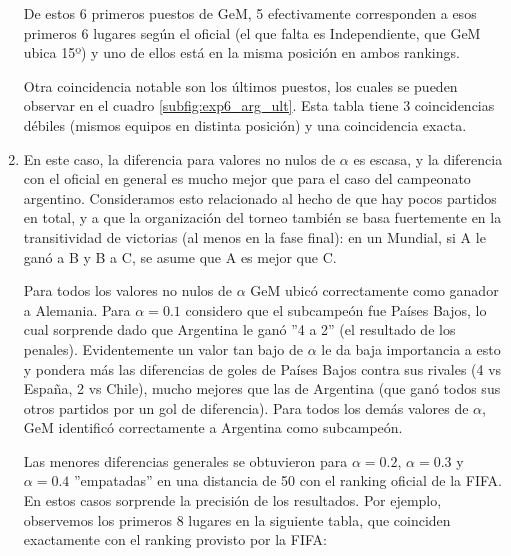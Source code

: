 \begin{enumerate}[parsep=1ex]
        \par De estos 6 primeros puestos de GeM, 5 efectivamente corresponden a
        esos primeros 6 lugares según el oficial (el que falta es Independiente,
        que GeM ubica 15º) y uno de ellos está en la misma posición en ambos
        rankings.

        \par Otra coincidencia notable son los últimos puestos, los cuales se
        pueden observar en el cuadro \ref{subfig:exp6_arg_ult}. Esta tabla tiene
        3 coincidencias débiles (mismos equipos en distinta posición) y una
        coincidencia exacta.\\

    \item En este caso, la diferencia para valores no nulos de $\alpha$ 
        es escasa, y la diferencia con el oficial en general es mucho mejor que
        para el caso del campeonato argentino. Consideramos esto relacionado al
        hecho de que hay pocos partidos en total, y a que la organización del
        torneo también se basa fuertemente en la transitividad de victorias (al
        menos en la fase final): en un Mundial, si A le ganó a B y B a C, se asume que A es
        mejor que C.

        \par Para todos los valores no nulos de $\alpha$ GeM ubicó
        correctamente como ganador a Alemania. Para $\alpha=0.1$ considero que
        el subcampeón fue Países Bajos, lo cual sorprende dado que Argentina le
        ganó ''4 a 2'' (el resultado de los penales). Evidentemente un valor tan
        bajo de $\alpha$ le da baja importancia a esto y pondera más las
        diferencias de goles de Países Bajos contra sus rivales (4 vs España, 2
        vs Chile), mucho mejores que las de Argentina (que ganó todos sus
        otros partidos por un gol de diferencia). Para todos los demás valores de
        $\alpha$, GeM identificó correctamente a Argentina como subcampeón.

        \par Las menores diferencias generales se obtuvieron para $\alpha=0.2$,
        $\alpha=0.3$ y $\alpha=0.4$ ''empatadas'' en una distancia de 50 con el
        ranking oficial de la FIFA. En estos casos sorprende la precisión de los
        resultados. Por ejemplo, observemos los primeros 8 lugares en la
        siguiente tabla, que coinciden exactamente con el ranking provisto por
        la FIFA:


\end{enumerate}
